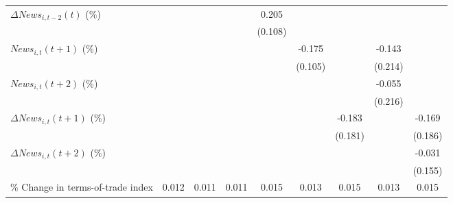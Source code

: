 {\begin{tabular}{l*{8}{c}}
\addlinespace
$ \Delta News_{i,t-2}(t)$ (\%)&                     &                     &                     &       0.205\sym{*}  &                     &                     &                     &                     \\
                    &                     &                     &                     &     (0.108)         &                     &                     &                     &                     \\
\addlinespace
$ News_{i,t}(t+1)$ (\%)&                     &                     &                     &                     &      -0.175         &                     &      -0.143         &                     \\
                    &                     &                     &                     &                     &     (0.105)         &                     &     (0.214)         &                     \\
\addlinespace
$ News_{i,t}(t+2)$ (\%)&                     &                     &                     &                     &                     &                     &      -0.055         &                     \\
                    &                     &                     &                     &                     &                     &                     &     (0.216)         &                     \\
\addlinespace
$ \Delta News_{i,t}(t+1)$ (\%)&                     &                     &                     &                     &                     &      -0.183         &                     &      -0.169         \\
                    &                     &                     &                     &                     &                     &     (0.181)         &                     &     (0.186)         \\
\addlinespace
$ \Delta News_{i,t}(t+2)$ (\%)&                     &                     &                     &                     &                     &                     &                     &      -0.031         \\
                    &                     &                     &                     &                     &                     &                     &                     &     (0.155)         \\
\addlinespace
\% Change in terms-of-trade index&       0.012         &       0.011         &       0.011         &       0.015         &       0.013         &       0.015         &       0.013         &       0.015         \\

\end{tabular}}
